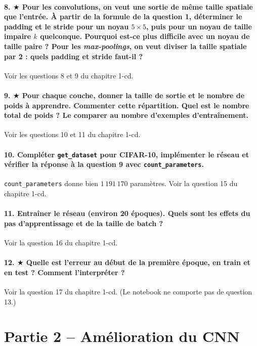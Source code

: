 \documentclass{report}
\begin{document}
\paragraph{8. $\bigstar$ Pour les convolutions, on veut une sortie de même taille spatiale que l'entrée. À partir de la formule de la question 1, déterminer le padding et le stride pour un noyau $5 \times 5$, puis pour un noyau de taille impaire $k$ quelconque. Pourquoi est-ce plus difficile avec un noyau de taille paire ? Pour les \textit{max-poolings}, on veut diviser la taille spatiale par 2 : quels padding et stride faut-il ?}
Voir les questions 8 et 9 du chapitre 1-cd.

\paragraph{9. $\bigstar$ Pour chaque couche, donner la taille de sortie et le nombre de poids à apprendre. Commenter cette répartition. Quel est le nombre total de poids ? Le comparer au nombre d'exemples d'entraînement.}
Voir les questions 10 et 11 du chapitre 1-cd.

\paragraph{10. Compléter \texttt{get\_dataset} pour CIFAR-10, implémenter le réseau et vérifier la réponse à la question 9 avec \texttt{count\_parameters}.}
\texttt{count\_parameters} donne bien $1\,191\,170$ paramètres. Voir la question 15 du chapitre 1-cd.

\paragraph{11. Entraîner le réseau (environ 20 époques). Quels sont les effets du pas d'apprentissage et de la taille de batch ?}
Voir la question 16 du chapitre 1-cd.

\paragraph{12. $\bigstar$ Quelle est l'erreur au début de la première époque, en train et en test ? Comment l'interpréter ?}
Voir la question 17 du chapitre 1-cd. (Le notebook ne comporte pas de question 13.)

\section{Partie 2 -- Amélioration du CNN}
\end{document}
